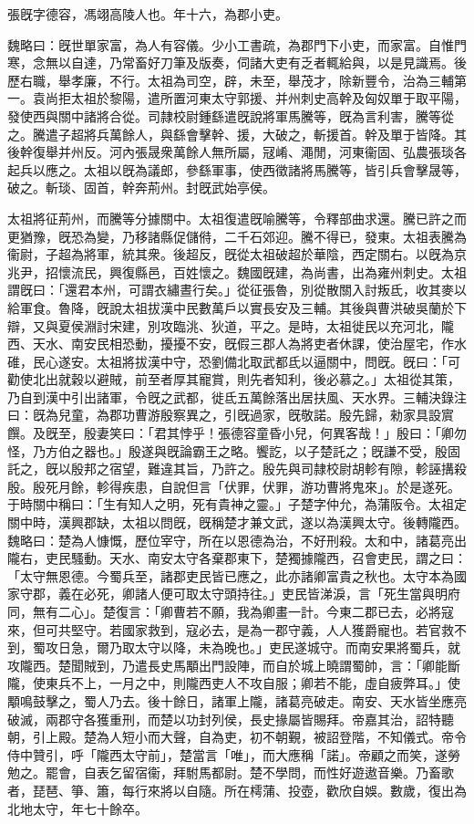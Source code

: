 
\begin{pinyinscope}
張旣字德容，馮翊高陵人也。年十六，為郡小吏。

魏略曰：旣世單家富，為人有容儀。少小工書疏，為郡門下小吏，而家富。自惟門寒，念無以自達，乃常畜好刀筆及版奏，伺諸大吏有乏者輒給與，以是見識焉。後歷右職，舉孝廉，不行。太祖為司空，辟，未至，舉茂才，除新豐令，治為三輔第一。袁尚拒太祖於黎陽，遣所置河東太守郭援、并州刺史高幹及匈奴單于取平陽，發使西與關中諸將合從。司隷校尉鍾繇遣旣說將軍馬騰等，旣為言利害，騰等從之。騰遣子超將兵萬餘人，與繇會擊幹、援，大破之，斬援首。幹及單于皆降。其後幹復舉并州反。河內張晟衆萬餘人無所屬，冦崤、澠閒，河東衞固、弘農張琰各起兵以應之。太祖以旣為議郎，參繇軍事，使西徵諸將馬騰等，皆引兵會擊晟等，破之。斬琰、固首，幹奔荊州。封旣武始亭侯。

太祖將征荊州，而騰等分據關中。太祖復遣旣喻騰等，令釋部曲求還。騰已許之而更猶豫，旣恐為變，乃移諸縣促儲偫，二千石郊迎。騰不得已，發東。太祖表騰為衞尉，子超為將軍，統其衆。後超反，旣從太祖破超於華陰，西定關右。以旣為京兆尹，招懷流民，興復縣邑，百姓懷之。魏國旣建，為尚書，出為雍州刺史。太祖謂旣曰：「還君本州，可謂衣繡晝行矣。」從征張魯，別從散關入討叛氐，收其麥以給軍食。魯降，旣說太祖拔漢中民數萬戶以實長安及三輔。其後與曹洪破吳蘭於下辯，又與夏侯淵討宋建，別攻臨洮、狄道，平之。是時，太祖徙民以充河北，隴西、天水、南安民相恐動，擾擾不安，旣假三郡人為將吏者休課，使治屋宅，作水碓，民心遂安。太祖將拔漢中守，恐劉備北取武都氐以逼關中，問旣。旣曰：「可勸使北出就穀以避賊，前至者厚其寵賞，則先者知利，後必慕之。」太祖從其策，乃自到漢中引出諸軍，令旣之武都，徙氐五萬餘落出居扶風、天水界。三輔決錄注曰：旣為兒童，為郡功曹游殷察異之，引旣過家，旣敬諾。殷先歸，勑家具設賔饌。及旣至，殷妻笑曰：「君其悖乎！張德容童昏小兒，何異客哉！」殷曰：「卿勿怪，乃方伯之器也。」殷遂與旣論霸王之略。饗訖，以子楚託之；旣謙不受，殷固託之，旣以殷邦之宿望，難違其旨，乃許之。殷先與司隷校尉胡軫有隙，軫誣搆殺殷。殷死月餘，軫得疾患，自說但言「伏罪，伏罪，游功曹將鬼來」。於是遂死。于時關中稱曰：「生有知人之明，死有貴神之靈。」子楚字仲允，為蒲阪令。太祖定關中時，漢興郡缺，太祖以問旣，旣稱楚才兼文武，遂以為漢興太守。後轉隴西。魏略曰：楚為人慷慨，歷位宰守，所在以恩德為治，不好刑殺。太和中，諸葛亮出隴右，吏民騷動。天水、南安太守各棄郡東下，楚獨據隴西，召會吏民，謂之曰：「太守無恩德。今蜀兵至，諸郡吏民皆已應之，此亦諸卿富貴之秋也。太守本為國家守郡，義在必死，卿諸人便可取太守頭持往。」吏民皆涕淚，言「死生當與明府同，無有二心」。楚復言：「卿曹若不願，我為卿畫一計。今東二郡已去，必將寇來，但可共堅守。若國家救到，寇必去，是為一郡守義，人人獲爵寵也。若官救不到，蜀攻日急，爾乃取太守以降，未為晚也。」吏民遂城守。而南安果將蜀兵，就攻隴西。楚聞賊到，乃遣長史馬顒出門設陣，而自於城上曉謂蜀帥，言：「卿能斷隴，使東兵不上，一月之中，則隴西吏人不攻自服；卿若不能，虛自疲弊耳。」使顒鳴鼓擊之，蜀人乃去。後十餘日，諸軍上隴，諸葛亮破走。南安、天水皆坐應亮破滅，兩郡守各獲重刑，而楚以功封列侯，長史掾屬皆賜拜。帝嘉其治，詔特聽朝，引上殿。楚為人短小而大聲，自為吏，初不朝覲，被詔登階，不知儀式。帝令侍中贊引，呼「隴西太守前」，楚當言「唯」，而大應稱「諾」。帝顧之而笑，遂勞勉之。罷會，自表乞留宿衞，拜駙馬都尉。楚不學問，而性好遊遨音樂。乃畜歌者，琵琶、箏、簫，每行來將以自隨。所在樗蒲、投壺，歡欣自娛。數歲，復出為北地太守，年七十餘卒。


\end{pinyinscope}
